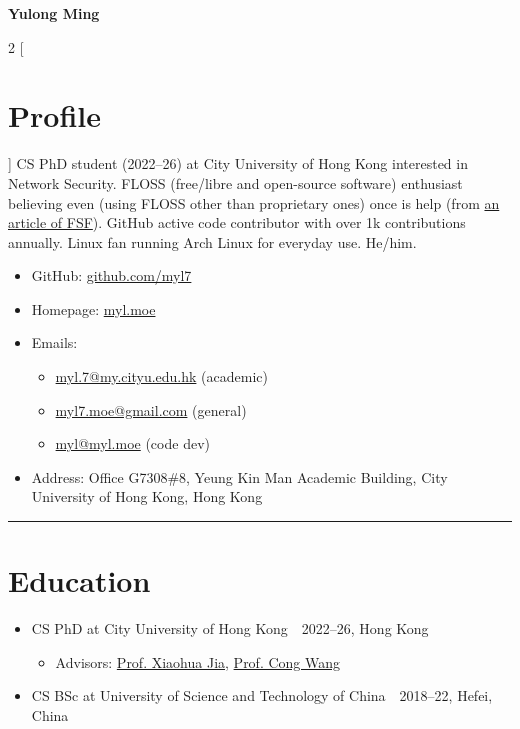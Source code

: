 \documentclass{article}
\begin{document}
\begin{center}
  {\huge \textbf{Yulong Ming}}
\end{center}

\begin{multicols}{2}
  [\section*{Profile}]
  CS PhD student (2022--26) at City University of Hong Kong interested in Network Security.
  FLOSS (free/libre and open-source software) enthusiast believing even (using FLOSS other than proprietary ones) once is help (from \href{https://www.gnu.org/philosophy/saying-no-even-once.html}{an article of FSF}).
  GitHub active code contributor with over 1k contributions annually.
  Linux fan running Arch Linux for everyday use.
  He/him.

  \begin{itemize}[itemsep=0cm,parsep=0cm]
    \item GitHub: \href{https://github.com/myl7}{github.com/myl7}
    \item Homepage: \href{https://myl.moe}{myl.moe}
    \item Emails:
    \begin{itemize}[itemsep=0cm,parsep=0cm,topsep=0cm,leftmargin=0.25cm,label=]
      \item \href{mailto:myl.7@my.cityu.edu.hk}{myl.7@my.cityu.edu.hk} (academic)
      \item \href{mailto:myl7.moe@gmail.com}{myl7.moe@gmail.com} (general)
      \item \href{mailto:myl@myl.moe}{myl@myl.moe} (code dev)
    \end{itemize}
    \item Address: Office G7308\#8, Yeung Kin Man Academic Building, City University of Hong Kong, Hong Kong
  \end{itemize}
\end{multicols}

\hrule

\section*{Education}
\begin{itemize}[parsep=0.1cm,leftmargin=0.4cm]
  \item CS PhD at City University of Hong Kong\ \dotfill\ 2022--26, Hong Kong
  \begin{itemize}[itemsep=0cm,parsep=0cm,topsep=0cm,leftmargin=0.25cm,label=]
    \item Advisors: \href{https://www.cs.cityu.edu.hk/~jia/}{Prof. Xiaohua Jia}, \href{https://www.cs.cityu.edu.hk/~congwang/}{Prof. Cong Wang}
  \end{itemize}
  \item CS BSc at University of Science and Technology of China\ \dotfill\ 2018--22, Hefei, China
\end{itemize}
\end{document}
